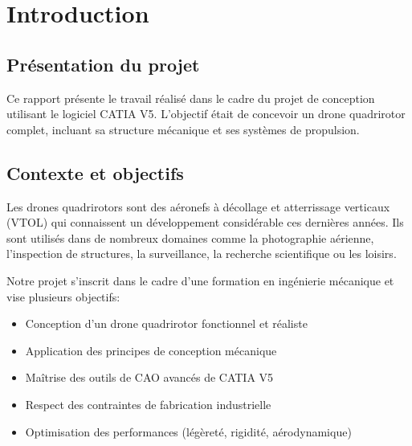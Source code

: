 \documentclass[a4paper,12pt]{report}
\begin{document}
\tableofcontents
\newpage

\chapter{Introduction}

\section{Présentation du projet}
Ce rapport présente le travail réalisé dans le cadre du projet de conception utilisant le logiciel CATIA V5. L'objectif était de concevoir un drone quadrirotor complet, incluant sa structure mécanique et ses systèmes de propulsion.

\section{Contexte et objectifs}
Les drones quadrirotors sont des aéronefs à décollage et atterrissage verticaux (VTOL) qui connaissent un développement considérable ces dernières années. Ils sont utilisés dans de nombreux domaines comme la photographie aérienne, l'inspection de structures, la surveillance, la recherche scientifique ou les loisirs.

Notre projet s'inscrit dans le cadre d'une formation en ingénierie mécanique et vise plusieurs objectifs:
\begin{itemize}
    \item Conception d'un drone quadrirotor fonctionnel et réaliste
    \item Application des principes de conception mécanique
    \item Maîtrise des outils de CAO avancés de CATIA V5
    \item Respect des contraintes de fabrication industrielle
    \item Optimisation des performances (légèreté, rigidité, aérodynamique)
\end{itemize}
\end{document}
